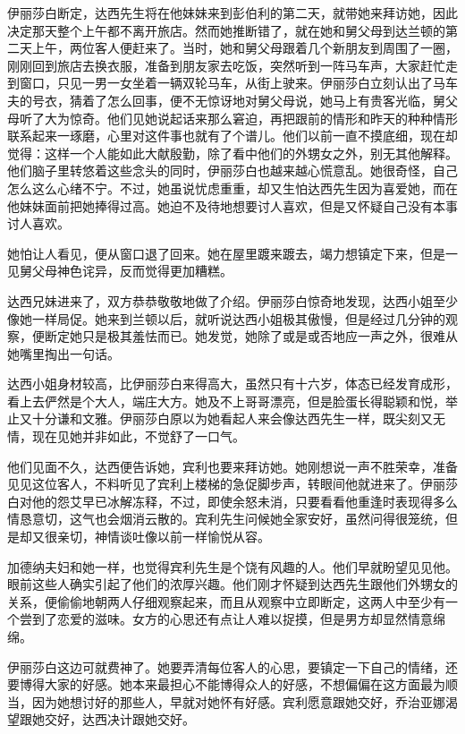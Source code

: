\par 伊丽莎白断定，达西先生将在他妹妹来到彭伯利的第二天，就带她来拜访她，因此决定那天整个上午都不离开旅店。然而她推断错了，就在她和舅父母到达兰顿的第二天上午，两位客人便赶来了。当时，她和舅父母跟着几个新朋友到周围了一圈，刚刚回到旅店去换衣服，准备到朋友家去吃饭，突然听到一阵马车声，大家赶忙走到窗口，只见一男一女坐着一辆双轮马车，从街上驶来。伊丽莎白立刻认出了马车夫的号衣，猜着了怎么回事，便不无惊讶地对舅父母说，她马上有贵客光临，舅父母听了大为惊奇。他们见她说起话来那么窘迫，再把跟前的情形和昨天的种种情形联系起来一琢磨，心里对这件事也就有了个谱儿。他们以前一直不摸底细，现在却觉得：这样一个人能如此大献殷勤，除了看中他们的外甥女之外，别无其他解释。他们脑子里转悠着这些念头的同时，伊丽莎白也越来越心慌意乱。她很奇怪，自己怎么这么心绪不宁。不过，她虽说忧虑重重，却又生怕达西先生因为喜爱她，而在他妹妹面前把她捧得过高。她迫不及待地想要讨人喜欢，但是又怀疑自己没有本事讨人喜欢。
\par 她怕让人看见，便从窗口退了回来。她在屋里踱来踱去，竭力想镇定下来，但是一见舅父母神色诧异，反而觉得更加糟糕。
\par 达西兄妹进来了，双方恭恭敬敬地做了介绍。伊丽莎白惊奇地发现，达西小姐至少像她一样局促。她来到兰顿以后，就听说达西小姐极其傲慢，但是经过几分钟的观察，便断定她只是极其羞怯而已。她发觉，她除了或是或否地应一声之外，很难从她嘴里掏出一句话。
\par 达西小姐身材较高，比伊丽莎白来得高大，虽然只有十六岁，体态已经发育成形，看上去俨然是个大人，端庄大方。她及不上哥哥漂亮，但是脸蛋长得聪颖和悦，举止又十分谦和文雅。伊丽莎白原以为她看起人来会像达西先生一样，既尖刻又无情，现在见她并非如此，不觉舒了一口气。
\par 他们见面不久，达西便告诉她，宾利也要来拜访她。她刚想说一声不胜荣幸，准备见见这位客人，不料听见了宾利上楼梯的急促脚步声，转眼间他就进来了。伊丽莎白对他的怨艾早已冰解冻释，不过，即使余怒未消，只要看看他重逢时表现得多么情恳意切，这气也会烟消云散的。宾利先生问候她全家安好，虽然问得很笼统，但是却又很亲切，神情谈吐像以前一样愉悦从容。
\par 加德纳夫妇和她一样，也觉得宾利先生是个饶有风趣的人。他们早就盼望见见他。眼前这些人确实引起了他们的浓厚兴趣。他们刚才怀疑到达西先生跟他们外甥女的关系，便偷偷地朝两人仔细观察起来，而且从观察中立即断定，这两人中至少有一个尝到了恋爱的滋味。女方的心思还有点让人难以捉摸，但是男方却显然情意绵绵。
\par 伊丽莎白这边可就费神了。她要弄清每位客人的心思，要镇定一下自己的情绪，还要博得大家的好感。她本来最担心不能博得众人的好感，不想偏偏在这方面最为顺当，因为她想讨好的那些人，早就对她怀有好感。宾利愿意跟她交好，乔治亚娜渴望跟她交好，达西决计跟她交好。
